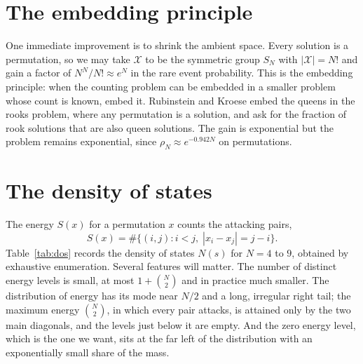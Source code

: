 \documentclass[11pt,twoside,openany]{book}
\theoremstyle{plain}
\theoremstyle{definition}
\theoremstyle{remark}
\newcommand{\cX}{\mathcal{X}}
\begin{document}
\section{The embedding principle}

One immediate improvement is to shrink the ambient space. Every solution is a permutation, so we may take $\cX$ to be the symmetric group $S_N$ with $|\cX| = N!$ and gain a factor of $N^N / N! \approx e^N$ in the rare event probability. This is the embedding principle: when the counting problem can be embedded in a smaller problem whose count is known, embed it. Rubinstein and Kroese \cite{RubinsteinKroese} embed the queens in the rooks problem, where any permutation is a solution, and ask for the fraction of rook solutions that are also queen solutions. The gain is exponential but the problem remains exponential, since $\rho_N \approx e^{-0.942 N}$ on permutations.

\section{The density of states}

The energy $S(x)$ for a permutation $x$ counts the attacking pairs,
\[
S(x) = \#\{ (i, j) : i < j, \; |x_i - x_j| = j - i \} .
\]
Table~\ref{tab:dos} records the density of states $N(s)$ for $N = 4$ to $9$, obtained by exhaustive enumeration. Several features will matter. The number of distinct energy levels is small, at most $1 + \binom{N}{2}$ and in practice much smaller. The distribution of energy has its mode near $N/2$ and a long, irregular right tail; the maximum energy $\binom{N}{2}$, in which every pair attacks, is attained only by the two main diagonals, and the levels just below it are empty. And the zero energy level, which is the one we want, sits at the far left of the distribution with an exponentially small share of the mass.
\end{document}
